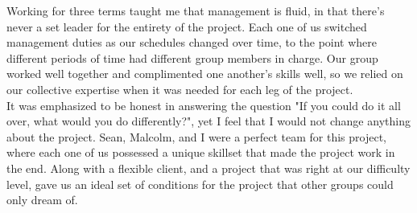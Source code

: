 Working for three terms taught me that management is fluid, in that there's never a set leader for the entirety of the project. Each one of us switched management duties as our schedules changed over time, to the point where different periods of time had different group members in charge. Our group worked well together and complimented one another's skills well, so we relied on our collective expertise when it was needed for each leg of the project.\\
It was emphasized to be honest in answering the question "If you could do it all over, what would you do differently?", yet I feel that I would not change anything about the project. Sean, Malcolm, and I were a perfect team for this project, where each one of us possessed a unique skillset that made the project work in the end. Along with a flexible client, and a project that was right at our difficulty level, gave us an ideal set of conditions for the project that other groups could only dream of.
